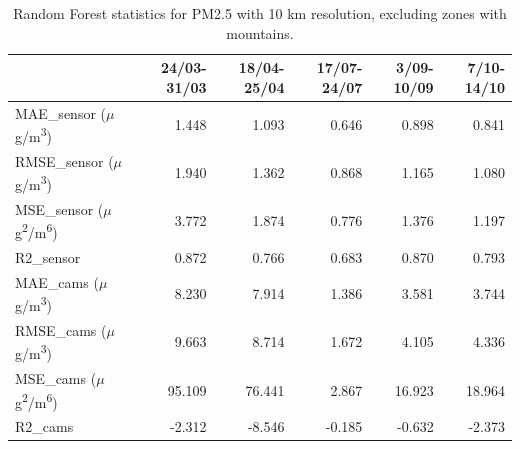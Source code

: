\begin{table}[H]
\begin{tabular}{lrrrrr}
\toprule
 &  24/03-31/03 &  18/04-25/04 &  17/07-24/07 &  3/09-10/09 &  7/10-14/10 \\
\midrule
 MAE\_sensor ($\mu$g/m\textsuperscript{3})&        1.448 &        1.093 &        0.646 &       0.898 &       0.841 \\
RMSE\_sensor ($\mu$g/m\textsuperscript{3})&        1.940 &        1.362 &        0.868 &       1.165 &       1.080 \\
 MSE\_sensor ($\mu$g\textsuperscript{2}/m\textsuperscript{6})&        3.772 &        1.874 &        0.776 &       1.376 &       1.197 \\
  R2\_sensor &        0.872 &        0.766 &        0.683 &       0.870 &       0.793 \\
   MAE\_cams ($\mu$g/m\textsuperscript{3})&        8.230 &        7.914 &        1.386 &       3.581 &       3.744 \\
  RMSE\_cams ($\mu$g/m\textsuperscript{3})&        9.663 &        8.714 &        1.672 &       4.105 &       4.336 \\
   MSE\_cams ($\mu$g\textsuperscript{2}/m\textsuperscript{6})&       95.109 &       76.441 &        2.867 &      16.923 &      18.964 \\
    R2\_cams &       -2.312 &       -8.546 &       -0.185 &      -0.632 &      -2.373 \\
\bottomrule
\bottomrule
\end{tabular}
\caption{Random Forest statistics for PM2.5 with 10 km resolution, excluding zones with mountains.}
\end{table}
